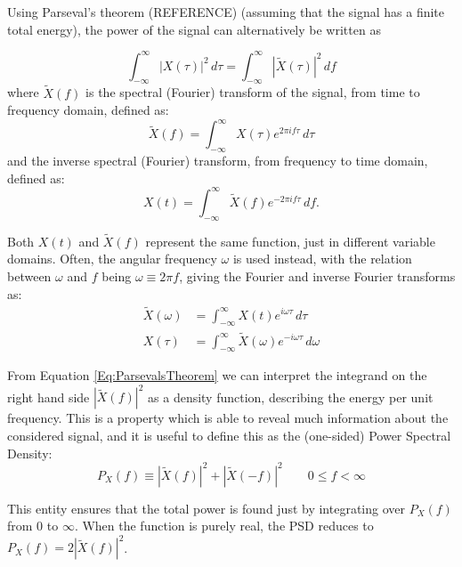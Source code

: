 \documentclass[../../CompleteThesis2/Complete_2ndDraft]{subfiles}
\begin{document}
Using Parseval's theorem (REFERENCE) (assuming that the signal has a finite total energy), the power of the signal can alternatively be written as

\begin{equation}
	\int_{-\infty}^{\infty} |X(\tau)|^2 \, d\tau = \int_{-\infty}^{\infty} |\tilde{X}(\tau)|^2\, df
	\label{Eq:ParsevalsTheorem}
\end{equation}
where $\tilde{X}(f)$ is the spectral (Fourier) transform of the signal, from time to frequency domain, defined as:
\begin{equation}
	\tilde{X}(f) = \int_{-\infty}^{\infty} X(\tau) e^{2\pi i f \tau} \, d\tau
	\label{Eq:FourierTransform}
\end{equation}
and the inverse spectral (Fourier) transform, from frequency to time domain, defined as:
\begin{equation}
	X(t) = \int_{-\infty}^{\infty} \tilde{X}(f) e^{-2\pi i f \tau}\, df.
	\label{Eq:InverseFourierTransform}
\end{equation}

Both $X(t)$ and $\tilde{X}(f)$ represent the same function, just in different variable domains. Often, the angular frequency $\omega$ is used instead, with the relation between $\omega$ and $f$ being $\omega \equiv 2\pi f $, giving the Fourier and inverse Fourier transforms as:
\begin{equation}
	\begin{aligned}
		\tilde{X}(\omega) &= \int_{-\infty}^{\infty} X(t) e^{i\omega\tau}\, d\tau \\
		X(\tau) &= \int_{-\infty}^{\infty} \tilde{X}(\omega) e^{-i\omega\tau}\, d\omega
		\label{Eq:FourierTransformAngular}
	\end{aligned} 
\end{equation}

From Equation \ref{Eq:ParsevalsTheorem} we can interpret the integrand on the right hand side $|\tilde{X}(f)|^2$ as a density function, describing the energy per unit frequency. This is a property which is able to reveal much information about the considered signal, and it is useful to define this as the (one-sided) Power Spectral Density: 
\begin{equation}
	P_X(f) \equiv |\tilde{X}(f)|^2 + |\tilde{X}(-f)|^2 \qquad 0 \leq f < \infty
\end{equation}

This entity ensures that the total power is found just by integrating over $P_X(f)$ from 0 to $\infty$. When the function is purely real, the PSD reduces to $P_X(f) = 2|\tilde{X}(f)|^2$.
\end{document}

